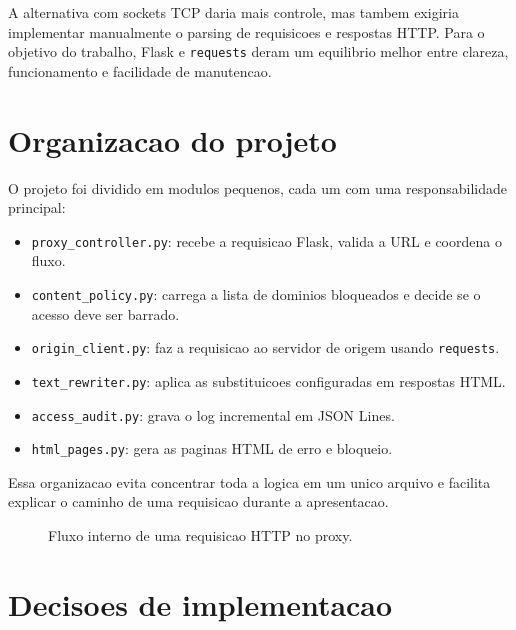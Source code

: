 \documentclass[12pt,a4paper]{article}
\begin{document}
A alternativa com sockets TCP daria mais controle, mas tambem exigiria implementar manualmente o parsing de requisicoes e respostas HTTP. Para o objetivo do trabalho, Flask e \texttt{requests} deram um equilibrio melhor entre clareza, funcionamento e facilidade de manutencao.

\section{Organizacao do projeto}

O projeto foi dividido em modulos pequenos, cada um com uma responsabilidade principal:

\begin{itemize}
  \item \texttt{proxy\_controller.py}: recebe a requisicao Flask, valida a URL e coordena o fluxo.
  \item \texttt{content\_policy.py}: carrega a lista de dominios bloqueados e decide se o acesso deve ser barrado.
  \item \texttt{origin\_client.py}: faz a requisicao ao servidor de origem usando \texttt{requests}.
  \item \texttt{text\_rewriter.py}: aplica as substituicoes configuradas em respostas HTML.
  \item \texttt{access\_audit.py}: grava o log incremental em JSON Lines.
  \item \texttt{html\_pages.py}: gera as paginas HTML de erro e bloqueio.
\end{itemize}

Essa organizacao evita concentrar toda a logica em um unico arquivo e facilita explicar o caminho de uma requisicao durante a apresentacao.

\begin{figure}[h]
\centering
{}
\caption{Fluxo interno de uma requisicao HTTP no proxy.}
\end{figure}

\section{Decisoes de implementacao}
\end{document}
